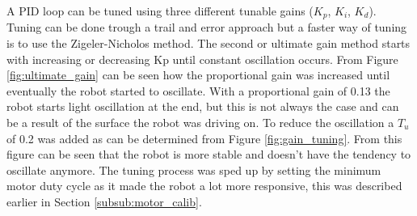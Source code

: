 A PID loop can be tuned using three different tunable gains ($K_{p}$, $K_{i}$, $K_{d}$).
Tuning can be done trough a trail and error approach but a faster way of tuning is to use the Zigeler-Nicholos method.
The second or ultimate gain method starts with increasing or decreasing Kp until constant oscillation occurs.
From Figure \ref{fig:ultimate_gain} can be seen how the proportional gain was increased until eventually the robot started to oscillate.
With a proportional gain of 0.13 the robot starts light oscillation at the end, but this is not always the case and can be a result of the surface the robot was driving on.
To reduce the oscillation a $T_{u}$ of 0.2 was added as can be determined from Figure \ref{fig:gain_tuning}.
From this figure can be seen that the robot is more stable and doesn't have the tendency to oscillate anymore.
The tuning process was sped up by setting the minimum motor duty cycle as it made the robot a lot more responsive, this was described earlier in Section \ref{subsub:motor_calib}.



